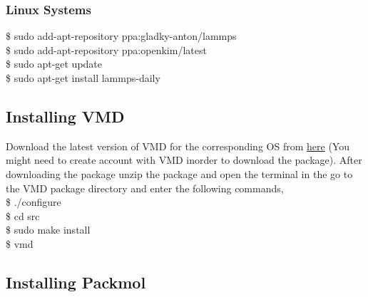 \documentclass[12pt]{article}
\begin{document}
\subsubsection{Linux Systems}
\$ sudo add-apt-repository ppa:gladky-anton/lammps\\
\$ sudo add-apt-repository ppa:openkim/latest\\
\$ sudo apt-get update\\
\$ sudo apt-get install lammps-daily\\

\subsection{Installing VMD}

Download the latest version of VMD for the corresponding OS from 
\href{https://www.ks.uiuc.edu/Development/Download/download.cgi?PackageName=VMD}{here} 
(You might need to create account with VMD inorder to download the package).
After downloading the package unzip the package and open the terminal in the 
go to the VMD package directory and enter the following commands,\\
\$ ./configure \\
\$ cd src \\ 
\$ sudo make install \\
\$ vmd \\

\subsection{Installing Packmol}





\end{document}
